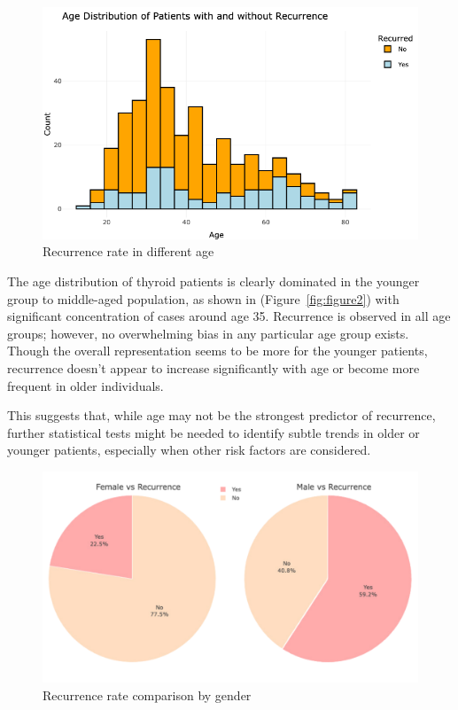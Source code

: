\documentclass[12pt]{article}
\begin{document}
\begin{enumerate}
 \begin{figure}[h]
 \vspace{5pt}
        \centering
        \includegraphics[width=1.1\textwidth]{Age vs recurrence.png}  
        \caption{Recurrence rate in different age}
            \label{fig:example}
       \vspace{1cm}
    \end{figure}


The age distribution of thyroid patients is clearly dominated in the younger group to middle-aged population, as shown in (Figure~\ref{fig:figure2}) with significant concentration of cases around age 35. Recurrence is observed in all age groups; however, no overwhelming bias in any particular age group exists. Though the overall representation seems to be more for the younger patients, recurrence doesn't appear to increase significantly with age or become more frequent in older individuals.

\hspace{9pt} This suggests that, while age may not be the strongest predictor of recurrence, further statistical tests might be needed to identify subtle trends in older or younger patients, especially when other risk factors are considered.

\newpage

    \begin{figure}[h]
        \vspace{5pt}
        \centering
        \includegraphics[width=1\textwidth]{gender vs recurrence.png}  
        \caption{Recurrence rate comparison by gender}
            \label{fig:example}
       \vspace{1cm}
    \end{figure}


\end{enumerate}
\end{document}
